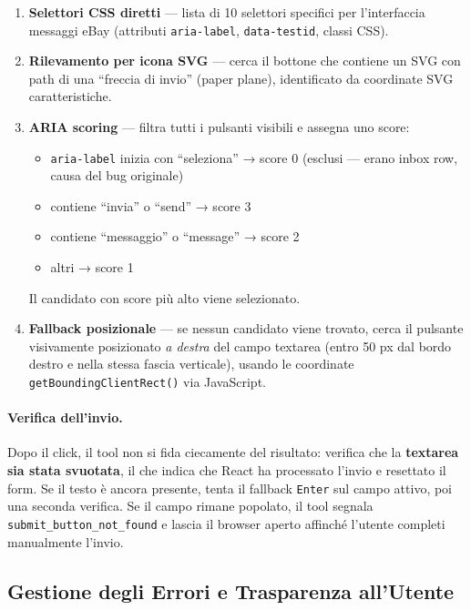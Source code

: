 \begin{enumerate}
    \item \textbf{Selettori CSS diretti} — lista di 10 selettori
        specifici per l'interfaccia messaggi eBay (attributi
        \texttt{aria-label}, \texttt{data-testid}, classi CSS).

    \item \textbf{Rilevamento per icona SVG} — cerca il bottone che
        contiene un SVG con path di una ``freccia di invio'' (paper
        plane), identificato da coordinate SVG caratteristiche.

    \item \textbf{ARIA scoring} — filtra tutti i pulsanti visibili
        e assegna uno score:
        \begin{itemize}
            \item \texttt{aria-label} inizia con ``seleziona'' → score 0
                (esclusi — erano inbox row, causa del bug originale)
            \item contiene ``invia'' o ``send'' → score 3
            \item contiene ``messaggio'' o ``message'' → score 2
            \item altri → score 1
        \end{itemize}
        Il candidato con score più alto viene selezionato.

    \item \textbf{Fallback posizionale} — se nessun candidato viene
        trovato, cerca il pulsante visivamente posizionato
        \emph{a destra} del campo textarea (entro 50 px dal bordo
        destro e nella stessa fascia verticale), usando le coordinate
        \texttt{getBoundingClientRect()} via JavaScript.
\end{enumerate}

\paragraph{Verifica dell'invio.}
Dopo il click, il tool non si fida ciecamente del risultato:
verifica che la \textbf{textarea sia stata svuotata}, il che indica
che React ha processato l'invio e resettato il form. Se il testo
è ancora presente, tenta il fallback \texttt{Enter} sul campo
attivo, poi una seconda verifica. Se il campo rimane popolato,
il tool segnala \texttt{submit\_button\_not\_found} e lascia il
browser aperto affinché l'utente completi manualmente l'invio.

\subsection{Gestione degli Errori e Trasparenza all'Utente}
\label{subsec:pw-contact-errors}

